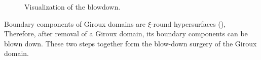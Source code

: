 \begin{figure}
\begin{subfigure}{.9\linewidth}
    \end{subfigure}
    \caption{Visualization of the blowdown.}
    \label{fig:blowdown}
\end{figure}

Boundary components of Giroux domains are 
$\xi$-round hypersurfaces (\cite[Section 5.3]{MNW13}),
Therefore, after removal of a Giroux domain,
its boundary components can be blown down.
These two steps together form the blow-down surgery of the Giroux domain.